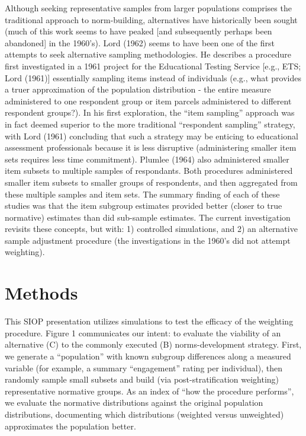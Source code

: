 \documentclass[
  ,man]{apa7}
\begin{document}
Although seeking representative samples from larger populations comprises the traditional approach to norm-building, alternatives have historically been sought (much of this work seems to have peaked {[}and subsequently perhaps been abandoned{]} in the 1960's). Lord (1962) seems to have been one of the first attempts to seek alternative sampling methodologies. He describes a procedure first investigated in a 1961 project for the Educational Testing Service {[}e.g., ETS; Lord (1961){]} essentially sampling items instead of individuals (e.g., what provides a truer approximation of the population distribution - the entire measure administered to one respondent group or item parcels administered to different respondent groups?). In his first exploration, the ``item sampling'' approach was in fact deemed superior to the more traditional ``respondent sampling'' strategy, with Lord (1961) concluding that such a strategy may be enticing to educational assessment professionals because it is less disruptive (administering smaller item sets requires less time commitment). Plumlee (1964) also administered smaller item subsets to multiple samples of respondants. Both procedures administered smaller item subsets to smaller groups of respondents, and then aggregated from these multiple samples and item sets. The summary finding of each of these studies was that the item subgroup estimates provided better (closer to true normative) estimates than did sub-sample estimates. The current investigation revisits these concepts, but with: 1) controlled simulations, and 2) an alternative sample adjustment procedure (the investigations in the 1960's did not attempt weighting).

\hypertarget{methods}{%
\section{Methods}\label{methods}}

This SIOP presentation utilizes simulations to test the efficacy of the weighting procedure. Figure 1 communicates our intent: to evaluate the viability of an alternative (C) to the commonly executed (B) norms-development strategy. First, we generate a ``population'' with known subgroup differences along a measured variable (for example, a summary ``engagement'' rating per individual), then randomly sample small subsets and build (via post-stratification weighting) representative normative groups. As an index of ``how the procedure performs'', we evaluate the normative distributions against the original population distributions, documenting which distributions (weighted versus unweighted) approximates the population better.
\end{document}

